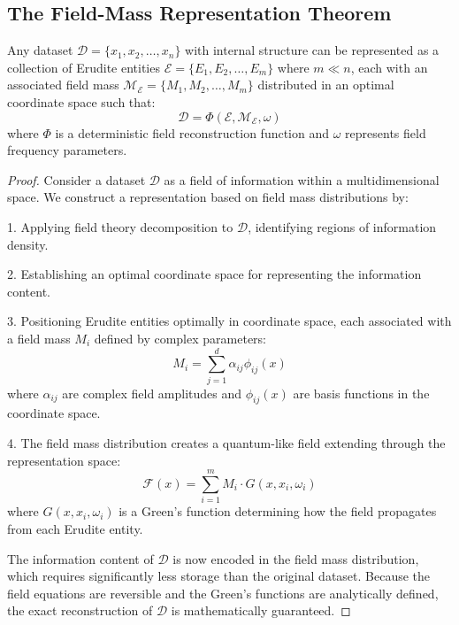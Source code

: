 \subsection{The Field-Mass Representation Theorem}

\begin{theorem}
Any dataset $\mathcal{D} = \{x_1, x_2, \ldots, x_n\}$ with internal structure can be represented as a collection of Erudite entities $\mathcal{E} = \{E_1, E_2, \ldots, E_m\}$ where $m \ll n$, each with an associated field mass $\mathcal{M}_{\mathcal{E}} = \{M_1, M_2, \ldots, M_m\}$ distributed in an optimal coordinate space such that:
\begin{equation}
\mathcal{D} = \Phi(\mathcal{E}, \mathcal{M}_{\mathcal{E}}, \omega)
\end{equation}
where $\Phi$ is a deterministic field reconstruction function and $\omega$ represents field frequency parameters.
\end{theorem}

\begin{proof}
Consider a dataset $\mathcal{D}$ as a field of information within a multidimensional space. We construct a representation based on field mass distributions by:

1. Applying field theory decomposition to $\mathcal{D}$, identifying regions of information density.

2. Establishing an optimal coordinate space for representing the information content.

3. Positioning Erudite entities optimally in coordinate space, each associated with a field mass $M_i$ defined by complex parameters:
\begin{equation}
M_i = \sum_{j=1}^d \alpha_{ij} \phi_{ij}(x)
\end{equation}
where $\alpha_{ij}$ are complex field amplitudes and $\phi_{ij}(x)$ are basis functions in the coordinate space.

4. The field mass distribution creates a quantum-like field extending through the representation space:
\begin{equation}
\mathcal{F}(x) = \sum_{i=1}^m M_i \cdot G(x, x_i, \omega_i)
\end{equation}
where $G(x, x_i, \omega_i)$ is a Green's function determining how the field propagates from each Erudite entity.

The information content of $\mathcal{D}$ is now encoded in the field mass distribution, which requires significantly less storage than the original dataset. Because the field equations are reversible and the Green's functions are analytically defined, the exact reconstruction of $\mathcal{D}$ is mathematically guaranteed.
\end{proof}

